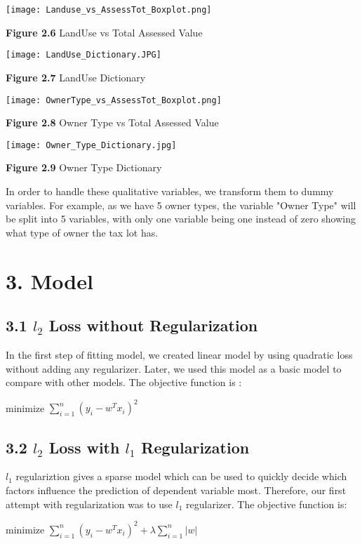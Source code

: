 \documentclass[9pt,twocolumn,twoside]{pnas-new}
\begin{document}
\texttt{[image: Landuse\_vs\_AssessTot\_Boxplot.png]} 
\begin{center}
\textbf{Figure 2.6} LandUse vs Total Assessed Value 
\end{center}
\texttt{[image: LandUse\_Dictionary.JPG]} 
\begin{center}
\textbf{Figure 2.7} LandUse Dictionary
\end{center}
\texttt{[image: OwnerType\_vs\_AssessTot\_Boxplot.png]} 
\begin{center}
\textbf{Figure 2.8} Owner Type vs Total Assessed Value 
\end{center}
\texttt{[image: Owner\_Type\_Dictionary.jpg]} 
\begin{center}
\textbf{Figure 2.9} Owner Type Dictionary
\end{center}

\noindent In order to handle these qualitative variables, we transform them to dummy variables. For example, as we have 5 owner types, the variable "Owner Type" will be split into 5 variables, with only one variable being one instead of zero showing what type of owner the tax lot has.

\section*{3. Model}

\subsection*{3.1 $l_{2}$ Loss without Regularization}
In the first step of fitting model, we created linear model by using quadratic loss without adding any regularizer. Later, we used this model as a basic model to compare with other models. The objective function is : 
\begin{center}
minimize $\sum_{i=1}^{n}(y_{i} - w^{T}x_{i})^{2}$ 
\end{center}

\subsection*{3.2 $l_{2}$ Loss with $l_{1}$ Regularization}
$l_1$ regulariztion gives a sparse model which can be used to quickly decide which factors influence the prediction of dependent variable most. 
Therefore, our first attempt with regularization was to use $l_{1}$ regularizer. The objective function is: 
\begin{center}
minimize $\sum_{i=1}^{n}(y_{i} - w^{T}x_{i})^{2} + \lambda\sum_{i=1}^{n}{|w|} $ 
\end{center}
\end{document}
